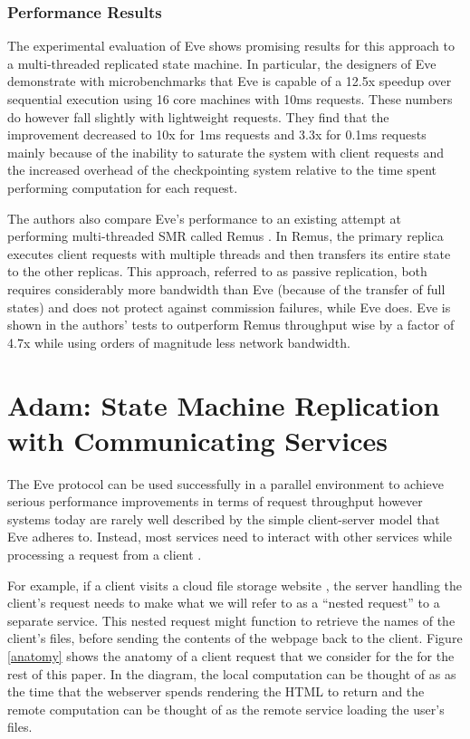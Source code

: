 \documentclass[11pt, oneside]{report}
\begin{document}
\subsection{Performance Results}\label{EveResults}

The experimental evaluation of Eve shows promising results for this approach to a multi-threaded replicated state machine. 
In particular, the designers of Eve demonstrate with microbenchmarks that Eve is capable of a 12.5x speedup over sequential execution using 16 core machines with 10ms requests. 
These numbers do however fall slightly with lightweight requests. 
They find that the improvement decreased to 10x for 1ms requests and 3.3x for 0.1ms requests mainly because of the inability to saturate the system with client requests and the increased overhead of the checkpointing system relative to the time spent performing computation for each request.

The authors also compare Eve's performance to an existing attempt at performing multi-threaded SMR called Remus \cite{remus}. 
In Remus, the primary replica executes client requests with multiple threads and then transfers its entire state to the other replicas. 
This approach, referred to as passive replication, both requires considerably more bandwidth than Eve (because of the transfer of full states) and does not protect against commission failures, while Eve does. 
Eve is shown in the authors' tests to outperform Remus throughput wise by a factor of 4.7x while using orders of magnitude less network bandwidth.

\chapter{Adam: State Machine Replication with Communicating Services}\label{Adam}

The Eve protocol can be used successfully in a parallel environment to achieve serious performance improvements in terms of request throughput however systems today are rarely well described by the simple client-server model that Eve adheres to.
Instead, most services need to interact with other services while processing a request from a client \cite{tao, spanner, dynamo}. 

For example, if a client visits a cloud file storage website \cite{dropbox}, the server handling the client's request needs to make what we will refer to as a ``nested request'' to a separate service. This nested request might function to retrieve the names of the client's files, before sending the contents of the webpage back to the client. Figure \ref{anatomy} shows the anatomy of a client request that we consider for the for the rest of this paper. In the diagram, the local computation can be thought of as as the time that the webserver spends rendering the HTML to return and the remote computation can be thought of as the remote service loading the user's files.
\end{document}
